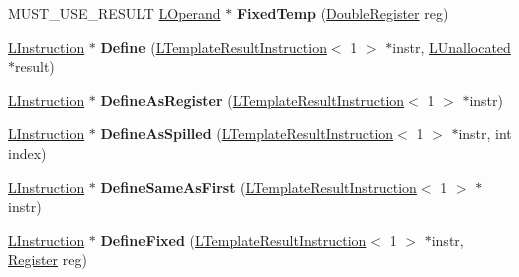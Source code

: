 \begin{DoxyCompactItemize}
\item 
M\+U\+S\+T\+\_\+\+U\+S\+E\+\_\+\+R\+E\+S\+U\+LT \hyperlink{classv8_1_1internal_1_1_l_operand}{L\+Operand} $\ast$ {\bfseries Fixed\+Temp} (\hyperlink{structv8_1_1internal_1_1_double_register}{Double\+Register} reg)\hypertarget{classv8_1_1internal_1_1_l_chunk_builder_adab20084d9ddf5e0e2c369ada7049b2e}{}\label{classv8_1_1internal_1_1_l_chunk_builder_adab20084d9ddf5e0e2c369ada7049b2e}

\item 
\hyperlink{classv8_1_1internal_1_1_l_instruction}{L\+Instruction} $\ast$ {\bfseries Define} (\hyperlink{classv8_1_1internal_1_1_l_template_result_instruction}{L\+Template\+Result\+Instruction}$<$ 1 $>$ $\ast$instr, \hyperlink{classv8_1_1internal_1_1_l_unallocated}{L\+Unallocated} $\ast$result)\hypertarget{classv8_1_1internal_1_1_l_chunk_builder_afd009a30c72fe37dd1b35d4241854ca0}{}\label{classv8_1_1internal_1_1_l_chunk_builder_afd009a30c72fe37dd1b35d4241854ca0}

\item 
\hyperlink{classv8_1_1internal_1_1_l_instruction}{L\+Instruction} $\ast$ {\bfseries Define\+As\+Register} (\hyperlink{classv8_1_1internal_1_1_l_template_result_instruction}{L\+Template\+Result\+Instruction}$<$ 1 $>$ $\ast$instr)\hypertarget{classv8_1_1internal_1_1_l_chunk_builder_af4f9a5078553b1f743899df249a25b31}{}\label{classv8_1_1internal_1_1_l_chunk_builder_af4f9a5078553b1f743899df249a25b31}

\item 
\hyperlink{classv8_1_1internal_1_1_l_instruction}{L\+Instruction} $\ast$ {\bfseries Define\+As\+Spilled} (\hyperlink{classv8_1_1internal_1_1_l_template_result_instruction}{L\+Template\+Result\+Instruction}$<$ 1 $>$ $\ast$instr, int index)\hypertarget{classv8_1_1internal_1_1_l_chunk_builder_a4e42c6b4bb935cc879f078e349ee6a1d}{}\label{classv8_1_1internal_1_1_l_chunk_builder_a4e42c6b4bb935cc879f078e349ee6a1d}

\item 
\hyperlink{classv8_1_1internal_1_1_l_instruction}{L\+Instruction} $\ast$ {\bfseries Define\+Same\+As\+First} (\hyperlink{classv8_1_1internal_1_1_l_template_result_instruction}{L\+Template\+Result\+Instruction}$<$ 1 $>$ $\ast$instr)\hypertarget{classv8_1_1internal_1_1_l_chunk_builder_a7a3e6bb64466e8d0b7062311bc13455a}{}\label{classv8_1_1internal_1_1_l_chunk_builder_a7a3e6bb64466e8d0b7062311bc13455a}

\item 
\hyperlink{classv8_1_1internal_1_1_l_instruction}{L\+Instruction} $\ast$ {\bfseries Define\+Fixed} (\hyperlink{classv8_1_1internal_1_1_l_template_result_instruction}{L\+Template\+Result\+Instruction}$<$ 1 $>$ $\ast$instr, \hyperlink{structv8_1_1internal_1_1_register}{Register} reg)\hypertarget{classv8_1_1internal_1_1_l_chunk_builder_a7dfb72b4e8c8ed4fc4acb6c8ce207af9}{}\label{classv8_1_1internal_1_1_l_chunk_builder_a7dfb72b4e8c8ed4fc4acb6c8ce207af9}


\end{DoxyCompactItemize}
